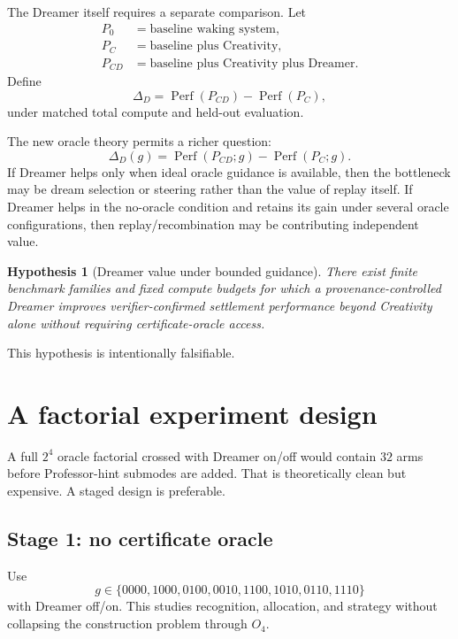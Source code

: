\documentclass[11pt]{article}
\newtheorem{hypothesis}[definition]{Hypothesis}
\newcommand{\Perf}{\operatorname{Perf}}
\begin{document}
The Dreamer itself requires a separate comparison. Let
\begin{align}
P_0 &= \text{baseline waking system},\\
P_C &= \text{baseline plus Creativity},\\
P_{CD} &= \text{baseline plus Creativity plus Dreamer}.
\end{align}
Define
\begin{equation}
\Delta_D=\Perf(P_{CD})-\Perf(P_C),
\end{equation}
under matched total compute and held-out evaluation.

The new oracle theory permits a richer question:
\begin{equation}
\Delta_D(g)=\Perf(P_{CD};g)-\Perf(P_C;g).
\end{equation}
If Dreamer helps only when ideal oracle guidance is available, then the bottleneck may be dream selection or steering rather than the value of replay itself. If Dreamer helps in the no-oracle condition and retains its gain under several oracle configurations, then replay/recombination may be contributing independent value.

\begin{hypothesis}[Dreamer value under bounded guidance]
There exist finite benchmark families and fixed compute budgets for which a provenance-controlled Dreamer improves verifier-confirmed settlement performance beyond Creativity alone without requiring certificate-oracle access.
\end{hypothesis}

This hypothesis is intentionally falsifiable.

\section{A factorial experiment design}

A full $2^4$ oracle factorial crossed with Dreamer on/off would contain $32$ arms before Professor-hint submodes are added. That is theoretically clean but expensive. A staged design is preferable.

\subsection*{Stage 1: no certificate oracle}
Use
\begin{equation}
g\in\{0000,1000,0100,0010,1100,1010,0110,1110\}
\end{equation}
with Dreamer off/on. This studies recognition, allocation, and strategy without collapsing the construction problem through $O_4$.
\end{document}
